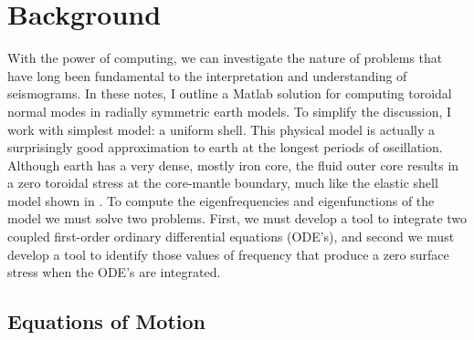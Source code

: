 \documentclass[11pt,titlepage,fleqn]{article}
\begin{document}

\clearpage\pagebreak
\section{Background}

With the power of computing, we can investigate the nature of problems that have long been fundamental to the interpretation and understanding of seismograms. In these notes, I outline a Matlab solution for computing toroidal normal modes in radially symmetric earth models. To simplify the discussion, I work with simplest model: a uniform shell. This physical model is actually a surprisingly good approximation to earth at the longest periods of oscillation. Although earth has a very dense, mostly iron core, the fluid outer core results in a zero toroidal stress at the core-mantle boundary, much like the elastic shell model shown in . To compute the eigenfrequencies and eigenfunctions of the model we must solve two problems. First, we must develop a tool to integrate two coupled first-order ordinary differential equations (ODE's), and second we must develop a tool to identify those values of frequency that produce a zero surface stress when the ODE's are integrated.

\subsection{Equations of Motion}
\end{document}

